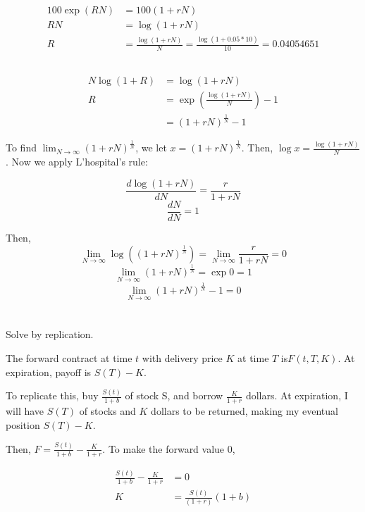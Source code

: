 \documentclass[11pt]{scrartcl}
\begin{document}
\subsubsection{}

\begin{align*}
100\exp{(RN)} &= 100(1+rN) \\
RN &= \log{(1+rN)} \\
R &= \frac{\log{(1+rN)}}{N} = \frac{\log{(1+0.05*10)}}{10} = 0.04054651
\end{align*}

\subsection{}

\begin{align*}
N \log{(1+R)} &= \log{(1+rN)} \\
R &= \exp{\left( \frac{\log{(1+rN)}}{N}\right)} - 1 \\
&= (1+rN)^{\frac{1}{N}} - 1
\end{align*}

To find $\lim_{N \to \infty} (1+rN)^{\frac{1}{N}}$, we let $x = (1+rN)^{\frac{1}{N}}$. Then, $\log{x} = \frac{\log{(1+rN)}}{N}$. Now we apply L'hospital's rule:

\[ \frac{d \log{(1+rN)}}{dN} = \frac{r}{1 + rN} \]
\[ \frac{d N}{dN} = 1 \]

Then,
\[ \lim_{N \to \infty} \log{\left((1+rN)^{\frac{1}{N}}\right)} = \lim_{N \to \infty} \frac{r}{1 + rN} = 0\]
\[ \lim_{N \to \infty} (1+rN)^{\frac{1}{N}} = \exp{0} = 1 \]
\[ \lim_{N \to \infty} (1+rN)^{\frac{1}{N}} - 1 = 0 \]

\section{}

Solve by replication. 

The forward contract at time $t$ with delivery price $K$ at time $T$ is$F(t, T, K)$. At expiration, payoff is $S(T) - K$.

To replicate this, buy $\frac{S(t)}{1+b}$ of stock S, and borrow $\frac{K}{1+r}$ dollars. At expiration, I will have $S(T)$ of stocks and $K$ dollars to be returned, making my eventual position $S(T) - K$.

Then, $F = \frac{S(t)}{1+b} - \frac{K}{1+r}$. To make the forward value 0, 

\begin{align*}
\frac{S(t)}{1+b} - \frac{K}{1+r} &= 0 \\
K &= \frac{S(t)}{(1+r)}{(1+b)}
\end{align*}
\end{document}
